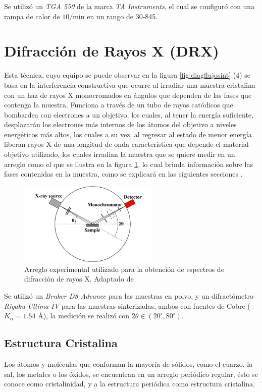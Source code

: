 \documentclass[../main.tex]{subfiles}
\begin{document}
Se utilizó un \textit{TGA 550} de la marca \textit{TA Instruments}, el cual se configuró con una rampa de calor de $10$\gradoC{}$/$min en un rango de 30\gradoC{}-845\gradoC{}.
\section{Difracción de Rayos X (DRX)} \label{sec:metodologiadrx}
Esta técnica, cuyo equipo se puede observar en la figura \ref{fig:diagflujosint} (4) se basa en la interferencia constructiva que ocurre al irradiar una muestra cristalina con un haz de rayos X monocromados en ángulos que dependen de las fases que contenga la muestra. Funciona a través de un tubo de rayos catódicos que bombardea con electrones a un objetivo, los cuales, al tener la energía suficiente, desplazarán los electrones más internos de los átomos del objetivo a niveles energéticos más altos, los cuales a su vez, al regresar al estado de menor energía liberan rayos X de una longitud de onda característica que depende el material objetivo utilizado, los cuales irradian la muestra que se quiere medir en un arreglo como el que se ilustra en la figura \ref{fig:diagDRX}, lo cual brinda información sobre las fases contenidas en la muestra, como se explicará en las siguientes secciones \cite{dutrowxrd}.
\begin{figure}[H]
    \centering
    \includegraphics[width=0.6\textwidth]{fig/DRXdiag.png}
    \caption{Arreglo experimental utilizado para la obtención de espectros de difracción de rayos X. Adaptado de \cite{Jung2023}}
    \label{fig:diagDRX}
\end{figure}

Se utilizó un \textit{Bruker D8 Advance} para las muestras en polvo, y un  difractómetro \textit{Rigaku Ultima IV} para las muestras sinterizadas, ambos con fuentes de Cobre ($K_\alpha=1.54$ \r{A}), la medición se realizó con $2\theta\in(20^\circ,80^\circ)$.
\subsection{Estructura Cristalina}
Los átomos y moléculas que conforman la mayoría de sólidos, como el cuarzo, la sal, los metales o los óxidos, se encuentran en un arreglo periódico regular, ésto se conoce como cristalinidad, y a la estructura periódica como estructura cristalina.
\end{document}
